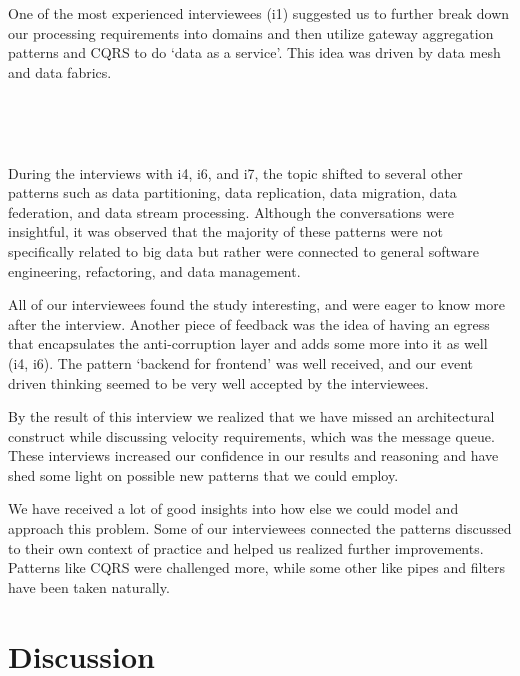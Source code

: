 \documentclass{bmcart}
\begin{document}
One of the most experienced interviewees (i1) suggested us to further break down our processing requirements into domains and then utilize gateway aggregation patterns and CQRS to do `data as a service'. This idea was driven by data mesh and data fabrics.

\,

\setlength{\fboxsep}{0.7em}
\noindent{}

\,

During the interviews with i4, i6, and i7, the topic shifted to several other patterns such as data partitioning, data replication, data migration, data federation, and data stream processing. Although the conversations were insightful, it was observed that the majority of these patterns were not specifically related to big data but rather were connected to general software engineering, refactoring, and data management. 

All of our interviewees found the study interesting, and were eager to know more after the interview. Another piece of feedback was the idea of having an egress that encapsulates the anti-corruption layer and adds some more into it as well (i4, i6). The pattern `backend for frontend' was well received, and our event driven thinking seemed to be very well accepted by the interviewees. 

By the result of this interview we realized that we have missed an architectural construct while discussing velocity requirements, which was the message queue. These interviews increased our confidence in our results and reasoning and have shed some light on possible new patterns that we could employ.

We have received a lot of good insights into how else we could model and approach this problem. Some of our interviewees connected the patterns discussed to their own context of practice and helped us realized further improvements. Patterns like CQRS were challenged more, while some other like pipes and filters have been taken naturally. 

\section{Discussion}
\end{document}
